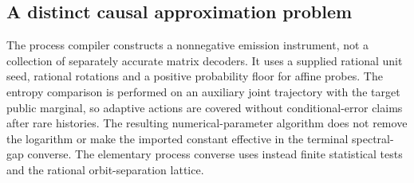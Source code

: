 \subsection{A distinct causal approximation problem}
The process compiler constructs a nonnegative emission instrument, not
a collection of separately accurate matrix decoders. It uses a supplied
rational unit seed, rational rotations and a positive probability floor
for affine probes. The entropy comparison is performed on an auxiliary
joint trajectory with the target public marginal, so adaptive actions
are covered without conditional-error claims after rare histories.
The resulting numerical-parameter algorithm does not remove the
logarithm or make the imported constant effective in the terminal
spectral-gap converse. The elementary process converse uses instead
finite statistical tests and the rational orbit-separation lattice.
